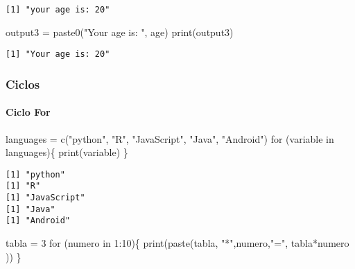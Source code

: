 \documentclass[
  letterpaper,
  DIV=11,
  numbers=noendperiod]{scrartcl}
\let\oldparagraph\paragraph
\renewcommand{\paragraph}[1]{\oldparagraph{#1}\mbox{}}
\newenvironment{Shaded}{\begin{snugshade}}{\end{snugshade}}
\newcommand{\ControlFlowTok}[1]{\textcolor[rgb]{0.00,0.23,0.31}{#1}}
\newcommand{\DecValTok}[1]{\textcolor[rgb]{0.68,0.00,0.00}{#1}}
\newcommand{\FunctionTok}[1]{\textcolor[rgb]{0.28,0.35,0.67}{#1}}
\newcommand{\NormalTok}[1]{\textcolor[rgb]{0.00,0.23,0.31}{#1}}
\newcommand{\OtherTok}[1]{\textcolor[rgb]{0.00,0.23,0.31}{#1}}
\newcommand{\SpecialCharTok}[1]{\textcolor[rgb]{0.37,0.37,0.37}{#1}}
\newcommand{\StringTok}[1]{\textcolor[rgb]{0.13,0.47,0.30}{#1}}
\begin{document}
\begin{verbatim}
[1] "your age is: 20"
\end{verbatim}

\begin{Shaded}
\begin{Highlighting}[]
\NormalTok{output3 }\OtherTok{=} \FunctionTok{paste0}\NormalTok{(}\StringTok{"Your age is: "}\NormalTok{, age)}
\FunctionTok{print}\NormalTok{(output3)}
\end{Highlighting}
\end{Shaded}

\begin{verbatim}
[1] "Your age is: 20"
\end{verbatim}

\subsubsection{Ciclos}\label{ciclos}

\paragraph{Ciclo For}\label{ciclo-for}

\begin{Shaded}
\begin{Highlighting}[]
\NormalTok{languages }\OtherTok{=} \FunctionTok{c}\NormalTok{(}\StringTok{"python"}\NormalTok{, }\StringTok{"R"}\NormalTok{, }\StringTok{"JavaScript"}\NormalTok{, }\StringTok{"Java"}\NormalTok{, }\StringTok{"Android"}\NormalTok{)}
\ControlFlowTok{for}\NormalTok{ (variable }\ControlFlowTok{in}\NormalTok{ languages)\{}
  \FunctionTok{print}\NormalTok{(variable)}
\NormalTok{\}}
\end{Highlighting}
\end{Shaded}

\begin{verbatim}
[1] "python"
[1] "R"
[1] "JavaScript"
[1] "Java"
[1] "Android"
\end{verbatim}

\begin{Shaded}
\begin{Highlighting}[]
\NormalTok{tabla }\OtherTok{=} \DecValTok{3}
\ControlFlowTok{for}\NormalTok{ (numero }\ControlFlowTok{in} \DecValTok{1}\SpecialCharTok{:}\DecValTok{10}\NormalTok{)\{}
  \FunctionTok{print}\NormalTok{(}\FunctionTok{paste}\NormalTok{(tabla, }\StringTok{"*"}\NormalTok{,numero,}\StringTok{"="}\NormalTok{, tabla}\SpecialCharTok{*}\NormalTok{numero ))}
\NormalTok{\}}
\end{Highlighting}
\end{Shaded}
\end{document}
